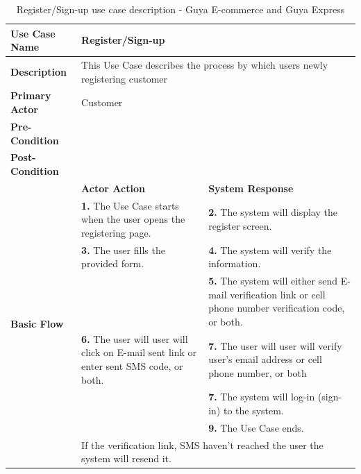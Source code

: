 \begin{table}[!ht]
\begin{tabular}{|l|p{6cm}|p{6cm}|}
\hline 
\rule[-1ex]{0pt}{2.5ex} \textbf{Use Case Name} & \multicolumn{2}{p{10cm}|}{Register/Sign-up} \\ 
\hline 
\rule[-1ex]{0pt}{2.5ex} \textbf{Description} &\multicolumn{2}{p{10cm}|}{This Use Case describes the process by which users newly registering customer} \\ 
\hline 
\rule[-1ex]{0pt}{2.5ex} \textbf{Primary Actor}& \multicolumn{2}{p{10cm}|}{Customer} \\ 
\hline 
\rule[-1ex]{0pt}{2.5ex} \textbf{Pre-Condition} & \multicolumn{2}{c|}{} \\ 
\hline 
\rule[-1ex]{0pt}{2.5ex} \textbf{Post-Condition} & \multicolumn{2}{p{10cm}|}{}  \\ 
\hline 
\multirow{8}{*}{\textbf{Basic Flow}} & \textbf{Actor Action} & \textbf{System Response}\\
%
&
\textbf{1.}  The Use Case starts when the user opens the registering page.
& 
\textbf{2.}  The system will display the register screen.
\\
%
&
\textbf{3.}  The user fills the provided form.
& 
\textbf{4.}  The system will verify the information. 
\\
%
&

& 
\textbf{5.}  The system will either send E-mail verification link or cell phone number verification code, or both. 
\\
%
&
\textbf{6.}  The user will user will click on E-mail sent link or enter sent SMS code, or both. 
& 
\textbf{7.}  The user will user will verify user's email address or cell phone number, or both
\\
%
&

& 
\textbf{7.}  The system will log-in (sign-in) to the system. 
\\
%
&

& 
\textbf{9.}  The Use Case ends. 
\\
\hline 
\rule[-1ex]{0pt}{2.5ex} \textbf{Alternate Flow} & \multicolumn{2}{p{10cm}|}{If the verification link, SMS haven't reached the user the system will resend it.}  \\ 
\hline 
\end{tabular}
\caption{Register/Sign-up use case description - Guya E-commerce and Guya Express} 
\end{table}

